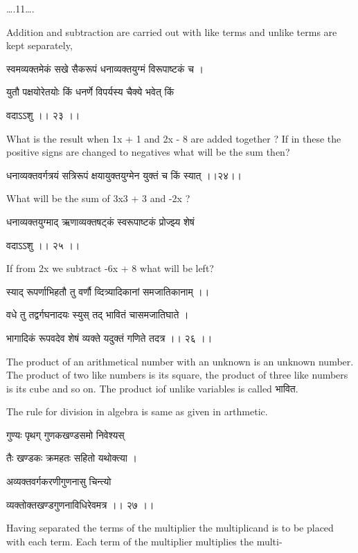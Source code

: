 \documentclass[]{article}
\date{}
\begin{document}
{\ldots{}.11\ldots{}. }

{Addition and subtraction are carried out with like terms and unlike
terms are kept separately,}

{स्वमव्यक्तमेकं सखे सैकरूपं धनाव्यक्तयुग्मं विरूपाष्टकं च । }

{युतौ पक्षयोरेतयोः किं धनर्णे विपर्यस्य चैक्ये भवे}{त्}{ किं }

{वदाऽऽशु ।। २३ ।। }

{What is the result when 1x + 1 and 2x - 8 are added together ? If in
these the positive signs are changed to negatives what will be the sum
then?}

{धनाव्यक्तवर्गत्रयं सत्रिरूपं क्षयायुक्तयुग्मेन युक्तं च किं स्यात्
।।२४।।}

{What will be the sum of 3x3 + 3 and -2x ? }

{धनाव्यक्तयुग्माद् ऋणाव्यक्तषट्कं स्वरूपाष्टकं प्रोज्झ्य शेषं }

{वदाऽऽशु ।। २५ ।। }

{If from 2x we subtract -6x + 8 what will be left?}

{स्याद् रूपर्णाभिहतौ तु वर्णौ व्दित्र्यादिकानां समजातिकानाम् ।। }

{वधे तु तद्वर्गघनादयः स्युस् तद् भावितं चासमजातिघाते । }

{भागादिकं रूपवदेव शेषं व्यक्ते यदुक्तं गणिते तदत्र ।। २६ ।। }

{The product of an arithmetical number with an unknown is an unknown
number. The product of two like numbers is its square, the product of
three like numbers is its cube and so on. The product iof unlike
variables is called भावित.}

{The rule for division in algebra is same as given in arthmetic.}

{गुण्यः पृथग् गुणकखण्डसमो निवेश्यस् }

{तैः खण्डकः क्रमहतः सहितो यथोक्त्या । }

{अव्यक्तवर्गकरणीगुणनासु चिन्त्यो }

{व्यक्तोक्तखण्डगुणनाविधिरेवमत्र ।। २७ ।। }

{Having separated the terms of the multiplier the multiplicand is to be
placed with each term. Each term of the multiplier multiplies the
multi-}
\end{document}
